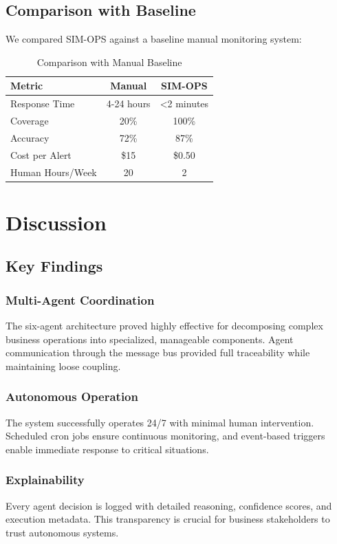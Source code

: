 \documentclass[conference]{IEEEtran}
\begin{document}
\subsection{Comparison with Baseline}
We compared SIM-OPS against a baseline manual monitoring system:

\begin{table}[htbp]
\caption{Comparison with Manual Baseline}
\begin{center}
\begin{tabular}{|l|c|c|}
\hline
\textbf{Metric} & \textbf{Manual} & \textbf{SIM-OPS} \\
\hline
Response Time & 4-24 hours & <2 minutes \\
Coverage & 20\% & 100\% \\
Accuracy & 72\% & 87\% \\
Cost per Alert & \$15 & \$0.50 \\
Human Hours/Week & 20 & 2 \\
\hline
\end{tabular}
\label{tab:comparison}
\end{center}
\end{table}

\section{Discussion}

\subsection{Key Findings}

\subsubsection{Multi-Agent Coordination}
The six-agent architecture proved highly effective for decomposing complex business operations into specialized, manageable components. Agent communication through the message bus provided full traceability while maintaining loose coupling.

\subsubsection{Autonomous Operation}
The system successfully operates 24/7 with minimal human intervention. Scheduled cron jobs ensure continuous monitoring, and event-based triggers enable immediate response to critical situations.

\subsubsection{Explainability}
Every agent decision is logged with detailed reasoning, confidence scores, and execution metadata. This transparency is crucial for business stakeholders to trust autonomous systems.
\end{document}
